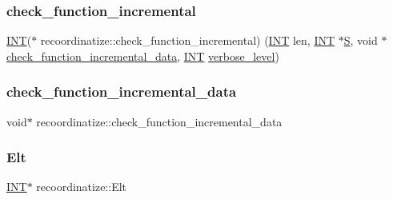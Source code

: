 \subsubsection{\texorpdfstring{check\+\_\+function\+\_\+incremental}{check\_function\_incremental}}
{\footnotesize\ttfamily \mbox{\hyperlink{galois_8h_a09fddde158a3a20bd2dcadb609de11dc}{I\+NT}}($\ast$ recoordinatize\+::check\+\_\+function\+\_\+incremental) (\mbox{\hyperlink{galois_8h_a09fddde158a3a20bd2dcadb609de11dc}{I\+NT}} len, \mbox{\hyperlink{galois_8h_a09fddde158a3a20bd2dcadb609de11dc}{I\+NT}} $\ast$\mbox{\hyperlink{simeon_8_c_adab47f8243f1b5a2c31df2535d6b37d0}{S}}, void $\ast$\mbox{\hyperlink{classrecoordinatize_acbac3a8d02e4356dcaa0c0af45180ed5}{check\+\_\+function\+\_\+incremental\+\_\+data}}, \mbox{\hyperlink{galois_8h_a09fddde158a3a20bd2dcadb609de11dc}{I\+NT}} \mbox{\hyperlink{simeon_8_c_a818073fbcc2f439e7c56952f67386122}{verbose\+\_\+level}})}

\mbox{\label{classrecoordinatize_acbac3a8d02e4356dcaa0c0af45180ed5}} 
\subsubsection{\texorpdfstring{check\+\_\+function\+\_\+incremental\+\_\+data}{check\_function\_incremental\_data}}
{\footnotesize\ttfamily void$\ast$ recoordinatize\+::check\+\_\+function\+\_\+incremental\+\_\+data}

\mbox{\label{classrecoordinatize_a89f01f4e5cd89189d13028c97b6e656b}} 
\subsubsection{\texorpdfstring{Elt}{Elt}}
{\footnotesize\ttfamily \mbox{\hyperlink{galois_8h_a09fddde158a3a20bd2dcadb609de11dc}{I\+NT}}$\ast$ recoordinatize\+::\+Elt}

\mbox{\label{classrecoordinatize_a7c80bdb5ce471ec0d6b674c6066210a6}} 

